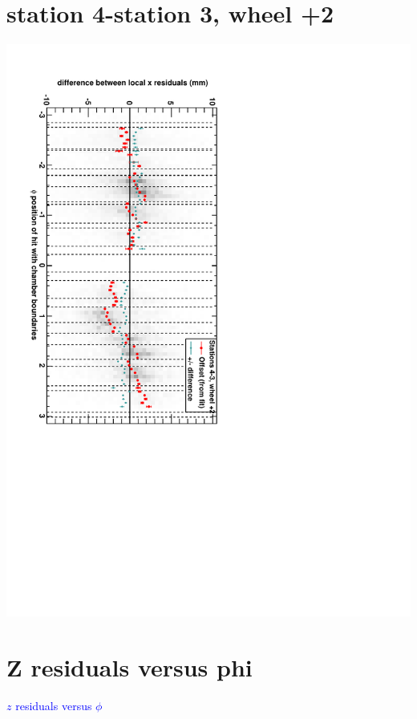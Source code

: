 \documentclass[compress]{beamer}
\begin{document}
\section*{station 4-station 3, wheel +2}
\begin{frame} \vfill \mbox{\hspace{-1 cm}\includegraphics[height=1.2\linewidth, angle=90]{DTrphidiff34VsPhi_whE_slope.pdf}} \end{frame}

\section*{Z residuals versus phi}
\begin{frame}
\begin{center}
\Huge \textcolor{blue}{$z$ residuals versus $\phi$}
\end{center}
\end{frame}
\end{document}
